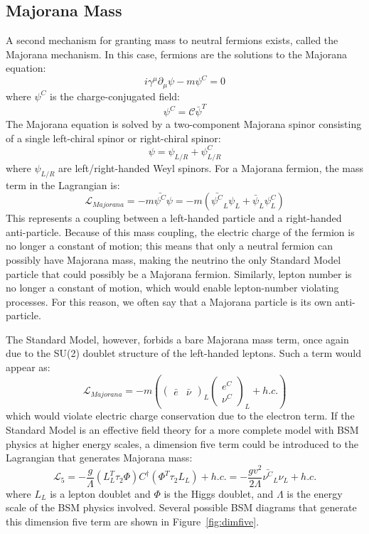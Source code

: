 \documentclass[/main.tex]{subfiles}
\begin{document}
\subsection{Majorana Mass}
A second mechanism for granting mass to neutral fermions exists, called the Majorana mechanism\cite{Majorana1937}.
In this case, fermions are the solutions to the Majorana equation:
\begin{equation}
  i\gamma^\mu\partial_\mu\psi - m\psi^C = 0
\end{equation}
where $\psi^C$ is the charge-conjugated field:
\begin{equation}
  \psi^C=\mathcal{C}\bar\psi^T
\end{equation}
The Majorana equation is solved by a two-component Majorana spinor consisting of a single left-chiral spinor or right-chiral spinor:
\begin{equation}
  \psi=\psi_{L/R}+\psi_{L/R}^C
\end{equation}
where $\psi_{L/R}$ are left/right-handed Weyl spinors.
For a Majorana fermion, the mass term in the Lagrangian is:
\begin{equation}
  \mathcal{L}_{Majorana}=-m\bar{\psi^C}\psi=-m(\bar{\psi^C}_L\psi_L + \bar\psi_L\psi^C_L)
\end{equation}
This represents a coupling between a left-handed particle and a right-handed anti-particle.
Because of this mass coupling, the electric charge of the fermion is no longer a constant of motion; this means that only a neutral fermion can possibly have Majorana mass, making the neutrino the only Standard Model particle that could possibly be a Majorana fermion.
Similarly, lepton number is no longer a constant of motion, which would enable lepton-number violating processes.
For this reason, we often say that a Majorana particle is its own anti-particle.

The Standard Model, however, forbids a bare Majorana mass term, once again due to the SU(2) doublet structure of the left-handed leptons.
Such a term would appear as:
\begin{equation}
  \mathcal{L}_{Majorana}=-m\left(\begin{pmatrix}\bar e & \bar\nu\end{pmatrix}_L\begin{pmatrix}e^C \\ \nu^C\end{pmatrix}_L + h.c.\right)
\end{equation}
which would violate electric charge conservation due to the electron term.
If the Standard Model is an effective field theory for a more complete model with BSM physics at higher energy scales, a dimension five term could be introduced to the Lagrangian that generates Majorana mass:
\begin{equation} \label{eq:dimfive}
  \mathcal{L}_5= -\frac{g}{\Lambda}(L^T_L\tau_2\Phi)C^\dagger(\Phi^T\tau_2L_L) + h.c. = -\frac{gv^2}{2\Lambda}\bar{\nu^C}_L\nu_L + h.c.
\end{equation}
where $L_L$ is a lepton doublet and $\Phi$ is the Higgs doublet, and $\Lambda$ is the energy scale of the BSM physics involved.
Several possible BSM diagrams that generate this dimension five term are shown in Figure~\ref{fig:dimfive}.
\end{document}
